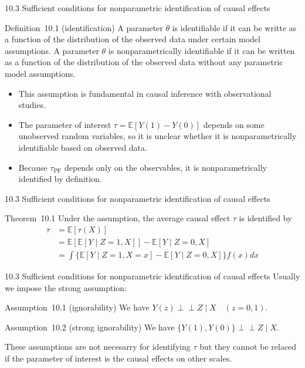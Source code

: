 \documentclass[aspectratio=169, 12pt]{beamer}
\begin{document}
\begin{frame}{10.3 Sufficient conditions for nonparametric identification of causal effects}
  \begin{keybox}{Definition~10.1 (identification)}
    A parameter $\theta$ is identifiable if it can be writte as a function of the distribution of the observed data under certain model assumptions. A parameter $\theta$ is nonparametrically identifiable if it can be written as a function of the distribution of the observed data without any parametric model assumptions.
  \end{keybox}
  \begin{itemize}
    \item This assumption is fundamental in causal inference with observational studies.
    \item The parameter of interest $\tau=\mathbb{E}[Y(1)-Y(0)]$ depends on some unobserved random variables, so it is unclear whether it is nonparametrically identifiable based on observed data.
    \item Because $\tau_{\text{PF}}$ depends only on the observables, it is nonparametrically identified by definition.
  \end{itemize}
\end{frame}

\begin{frame}{10.3 Sufficient conditions for nonparametric identification of causal effects}
  \begin{keybox}{Theorem~10.1}
    Under the assumption, the average causal effect $\tau$ is identified by
    \begin{align*}
      \tau &=\mathbb{E}[\tau(X)]\\
      &= \mathbb{E}[\mathbb{E}[Y\mid Z=1,X]]-\mathbb{E}[Y\mid Z=0,X]\\
      &= \int \{\mathbb{E}[Y\mid Z=1,X=x]-\mathbb{E}[Y\mid Z=0,X]\}f(x)dx
    \end{align*}
  \end{keybox}
\end{frame}

\begin{frame}{10.3 Sufficient conditions for nonparametric identification of causal effects}
  Usually we impose the strong assumption:
  \begin{keybox}{Assumption~10.1 (ignorability)}
    We have $Y(z)\perp\!\!\!\perp Z\mid X\quad (z=0,1)$.
  \end{keybox}
  \begin{keybox}{Assumption~10.2 (strong ignorability)}
    We have $\{Y(1),Y(0)\}\perp\!\!\!\perp  Z \mid X$.
  \end{keybox}
  These assumptions are not necesarry for identifying $\tau$ but they cannot be relaced if the parameter of interest is the causal effects on other scales.
\end{frame}
\end{document}
